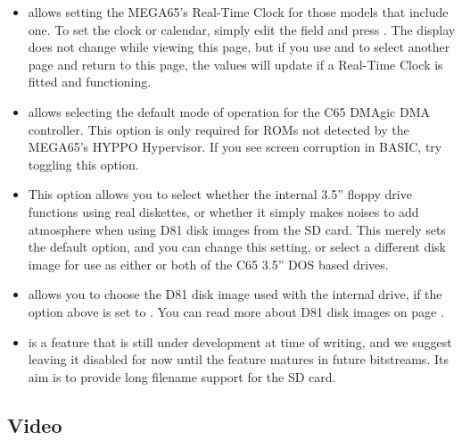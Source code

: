 \begin{itemize}
  \item {} allows setting the MEGA65's Real-Time
    Clock for those models that include one.  To set the clock or
    calendar, simply edit the field and press .
    The display does not change while viewing this page, but if
    you use \megakey{$\leftarrow$} and \megakey{$\rightarrow$} to select another page and
    return to this page, the values will update if a Real-Time Clock
    is fitted and functioning.
  \item {} allows selecting the default mode of
    operation for the C65 DMAgic DMA controller.  This option is only
    required for ROMs not detected by the MEGA65's HYPPO Hypervisor.
    If you see screen corruption in BASIC,
    try toggling this option.
  \item {}
    This option allows you to select whether the internal 3.5'' floppy
    drive functions using real diskettes, or whether it simply makes
    noises to add atmosphere when using D81 disk images from the SD
    card.  This merely sets the default option, and you can change
    this setting, or select a different disk image for use as either
    or both of the C65 3.5'' DOS based drives.
  \item {} allows you to choose the D81 disk image
    used with the internal drive, if the 
    option above is set to . You can read more about
    D81 disk images on page \pageref{sec:d81-images}.
  \item {} is a feature that is still under development
    at time of writing, and we suggest leaving it disabled for now until the feature
    matures in future bitstreams. Its aim is to provide long filename support for the
    SD card.
\end{itemize}

\subsection{Video}

